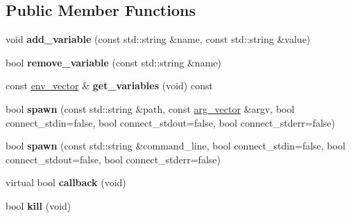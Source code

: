 \subsection*{Public Member Functions}
\begin{DoxyCompactItemize}
\item 
void {\bfseries add\+\_\+variable} (const std\+::string \&name, const std\+::string \&value)\hypertarget{classstlplus_1_1subprocess_ac30696d0d1ff3ea251274d1def7959fb}{}\label{classstlplus_1_1subprocess_ac30696d0d1ff3ea251274d1def7959fb}

\item 
bool {\bfseries remove\+\_\+variable} (const std\+::string \&name)\hypertarget{classstlplus_1_1subprocess_ac27f27bc82663d14c0a7407b394eeaad}{}\label{classstlplus_1_1subprocess_ac27f27bc82663d14c0a7407b394eeaad}

\item 
const \hyperlink{classstlplus_1_1env__vector}{env\+\_\+vector} \& {\bfseries get\+\_\+variables} (void) const \hypertarget{classstlplus_1_1subprocess_af5a86c674540b0139d7424744d34261a}{}\label{classstlplus_1_1subprocess_af5a86c674540b0139d7424744d34261a}

\item 
bool {\bfseries spawn} (const std\+::string \&path, const \hyperlink{classstlplus_1_1arg__vector}{arg\+\_\+vector} \&argv, bool connect\+\_\+stdin=false, bool connect\+\_\+stdout=false, bool connect\+\_\+stderr=false)\hypertarget{classstlplus_1_1subprocess_ae6631a8562c55539826c2da6a676bf3a}{}\label{classstlplus_1_1subprocess_ae6631a8562c55539826c2da6a676bf3a}

\item 
bool {\bfseries spawn} (const std\+::string \&command\+\_\+line, bool connect\+\_\+stdin=false, bool connect\+\_\+stdout=false, bool connect\+\_\+stderr=false)\hypertarget{classstlplus_1_1subprocess_a4134ae85618c8bcbf997481d014eb3cd}{}\label{classstlplus_1_1subprocess_a4134ae85618c8bcbf997481d014eb3cd}

\item 
virtual bool {\bfseries callback} (void)\hypertarget{classstlplus_1_1subprocess_a8a65b881cedadbbffd5af0d38c8e9f93}{}\label{classstlplus_1_1subprocess_a8a65b881cedadbbffd5af0d38c8e9f93}

\item 
bool {\bfseries kill} (void)\hypertarget{classstlplus_1_1subprocess_a3762395e08baf702da1728af1d173174}{}\label{classstlplus_1_1subprocess_a3762395e08baf702da1728af1d173174}


\end{DoxyCompactItemize}
